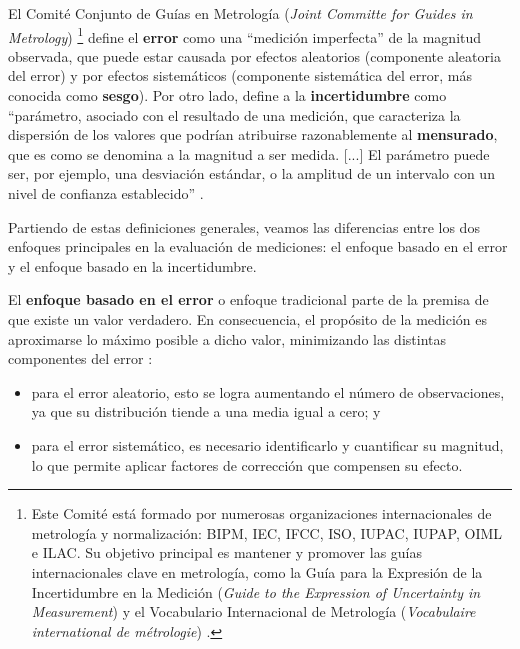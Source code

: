 El Comité Conjunto de Guías en Metrología (\textit{Joint Committe for Guides in Metrology})%
\footnote{
    Este Comité está formado por numerosas organizaciones internacionales de metrología y normalización: 
    BIPM, IEC, IFCC, ISO, IUPAC, IUPAP, OIML e ILAC. Su objetivo principal es mantener y promover las 
    guías internacionales clave en metrología, como la Guía para la Expresión de la Incertidumbre en la 
    Medición (\textit{Guide to the Expression of Uncertainty in Measurement}) \cite{jcgm100:2008} y el 
    Vocabulario Internacional de Metrología (\textit{Vocabulaire international de métrologie}) 
    \cite{jcgm200:2012}.
} 
define el \textbf{error} como una ``medición imperfecta'' de la magnitud observada, que puede estar causada por efectos aleatorios (componente aleatoria del error) y por efectos sistemáticos (componente sistemática del error, más conocida como \textbf{sesgo}). Por otro lado, define a la \textbf{incertidumbre} como ``parámetro, asociado con el resultado de una medición, que caracteriza la dispersión de los valores que podrían atribuirse razonablemente al \textbf{mensurado}, que es como se denomina a la magnitud a ser medida. [...] El parámetro puede ser, por ejemplo, una desviación estándar, o la amplitud de un intervalo con un nivel de confianza establecido'' \cite{jcgm100:2008}.

Partiendo de estas definiciones generales, veamos las diferencias entre los dos enfoques principales en la evaluación de mediciones: el enfoque basado en el error y el enfoque basado en la incertidumbre.

El \textbf{enfoque basado en el error} o enfoque tradicional parte de la premisa de que existe un valor verdadero. En consecuencia, el propósito de la medición es aproximarse lo máximo posible a dicho valor, minimizando las distintas componentes del error \cite{jcgm100:2008}:

\begin{itemize}

    \item para el error aleatorio, esto se logra aumentando el número de observaciones, ya que su distribución tiende a una media igual a cero; y

    \item para el error sistemático, es necesario identificarlo y cuantificar su magnitud, lo que permite aplicar factores de corrección que compensen su efecto.

\end{itemize}

